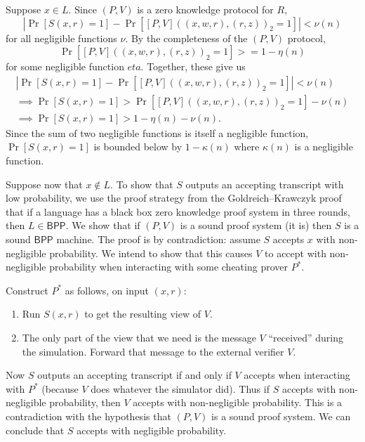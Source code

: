 \documentclass{article}
\newcommand{\class}[1]{{\ensuremath{\mathsf{#1}}}}
\newcommand{\BPP}{\class{BPP}}
\begin{document}
\begin{enumerate}
  Suppose $x\in L$.
  Since $(P, V)$ is a zero knowledge protocol for $R$,
  \begin{displaymath}
    \left|\Pr\left[S(x,r)=1\right] - \Pr\left[[P,V]((x, w, r), (r, z))_2=1\right]\right| < \nu(n)
  \end{displaymath}
  for all negligible functions $\nu$.
  By the completeness of the $(P, V)$ protocol,
  \begin{displaymath}
    \Pr\left[[P, V]((x, w, r), (r, z))_2 = 1\right] >= 1 - \eta(n)
  \end{displaymath}
  for some negligible function $eta$.
  Together, these give us
  \begin{align*}
    \left|\Pr\left[S(x,r)=1\right] - \Pr\left[[P,V]((x, w, r), (r, z))_2=1\right]\right| < \nu(n) \\
    \implies \Pr\left[S(x,r)=1\right] > \Pr\left[[P,V]((x, w, r), (r, z))_2=1\right] - \nu(n) \\
    \implies \Pr\left[S(x,r)=1\right] > 1 - \eta(n) - \nu(n).
  \end{align*}
  Since the sum of two negligible functions is itself a negligible function, $\Pr[S(x,r)=1]$ is bounded below by $1-\kappa(n)$ where $\kappa(n)$ is a negligible function.

  Suppose now that $x\notin L$.
  To show that $S$ outputs an accepting transcript with low probability, we use the proof strategy from the Goldreich--Krawczyk proof that if a language has a black box zero knowledge proof system in three rounds, then $L\in\BPP$.
  We show that if $(P, V)$ is a sound proof system (it is) then $S$ is a sound $\BPP$ machine.
  The proof is by contradiction: assume $S$ accepts $x$ with non-negligible probability.
  We intend to show that this causes $V$ to accept with non-negligible probability when interacting with some cheating prover $P^*$.

  Construct $P^*$ as follows, on input $(x, r)$:
  \begin{enumerate}
  \item Run $S(x, r)$ to get the resulting view of $V$.
  \item
    The only part of the view that we need is the message $V$ ``received'' during the simulation.
    Forward that message to the external verifier $V$.
  \end{enumerate}
  Now $S$ outputs an accepting transcript if and only if $V$ accepts when interacting with $P^*$ (because $V$ does whatever the simulator did).
  Thus if $S$ accepts with non-negligible probability, then $V$ accepts with non-negligible probability.
  This is a contradiction with the hypothesis that $(P, V)$ is a sound proof system.
  We can conclude that $S$ accepts with negligible probability.


\end{enumerate}
\end{document}
